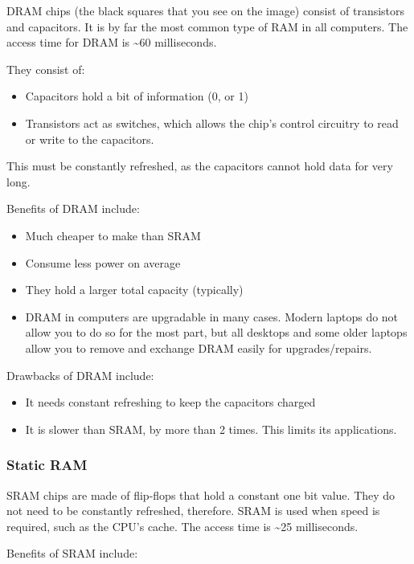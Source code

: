 \documentclass[../main.tex]{subfiles}
\begin{document}
DRAM chips (the black squares that you see on the image) consist of transistors and capacitors. It is by far the most common type of RAM in all computers. The access time for DRAM is \textasciitilde60 milliseconds.

They consist of:

\begin{itemize}
    \item Capacitors hold a bit of information (0, or 1)
    \item Transistors act as switches, which allows the chip's control circuitry to read or write to the capacitors.
\end{itemize}

This must be constantly refreshed, as the capacitors cannot hold data for very long.

Benefits of DRAM include:

\begin{itemize}
    \item Much cheaper to make than SRAM
    \item Consume less power on average
    \item They hold a larger total capacity (typically)
    \item DRAM in computers are upgradable in many cases. Modern laptops do not allow you to do so for the most part, but all desktops and some older laptops allow you to remove and exchange DRAM easily for upgrades/repairs.
\end{itemize}

Drawbacks of DRAM include:

\begin{itemize}
    \item It needs constant refreshing to keep the capacitors charged
    \item It is slower than SRAM, by more than 2 times. This limits its applications.
\end{itemize}

\subsubsection{Static RAM}

SRAM chips are made of flip-flops that hold a constant one bit value. They do not need to be constantly refreshed, therefore. SRAM is used when speed is required, such as the CPU's cache. The access time is \textasciitilde25 milliseconds.

Benefits of SRAM include:
\end{document}
